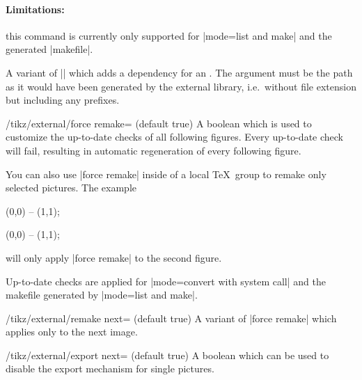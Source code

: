 {\begin{command}{\tikzpicturedependsonfile{}}
	\paragraph{Limitations:} this command is currently only supported for |mode=list and make| and the generated |makefile|.
\end{command}
\begin{command}{\tikzexternalfiledependsonfile{}}
	A variant of |\tikzpicturedependsonfile| which adds a dependency for an . The argument  must be the path as it would have been generated by the external library, i.e.\ without file extension but including any prefixes.
\end{command}

\begin{key}{/tikz/external/force remake= (default true)}
	A boolean which is used to customize the up-to-date checks of all following figures. Every up-to-date check will fail, resulting in automatic regeneration of every following figure.

\begin{codeexample}
\tikzset{external/force remake}
\end{codeexample}
	You can also use |force remake| inside of a local \TeX\ group to remake only selected pictures. The example
\begin{codeexample}
\tikz \draw (0,0) -- (1,1);

{
\tikzset{external/force remake}
}

\tikz \draw (0,0) -- (1,1);
\end{codeexample}
	will only apply |force remake| to the second figure.

	Up-to-date checks are applied for |mode=convert with system call| and the makefile generated by |mode=list and make|.
\end{key}

\begin{key}{/tikz/external/remake next= (default true)}
	A variant of |force remake| which applies only to the next image.
\end{key}

\begin{key}{/tikz/external/export next= (default true)}
	A boolean which can be used to disable the export mechanism for single pictures.
\end{key}

}
